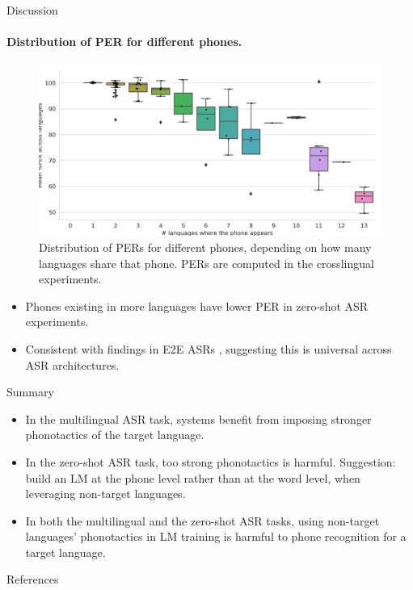 \documentclass{beamer}
\begin{document}
    
 \begin{frame}{Discussion}
 \framesubtitle{Distribution of PER for different phones.}
 \begin{figure}
     \centering
     \includegraphics[width=0.6\linewidth]{Figure/per_language_per_crosslingual.png}
     \caption{Distribution of PERs for different phones, depending on how many languages share that phone. PERs are computed in the crosslingual experiments.}
     \label{fig:distr_phone}
 \end{figure}
 \begin{block}{}
     \begin{footnotesize}
            \begin{itemize}
                \item Phones existing in more languages have lower PER in zero-shot ASR experiments.
                \item Consistent with findings in E2E ASRs \cite{Zelasko2020That_interspeech}, suggesting this is universal across ASR architectures.
            \end{itemize}
     \end{footnotesize}
 \end{block}
     
 \end{frame}
 \begin{frame}{Summary}
\begin{itemize}
    \item In the multilingual ASR task, systems benefit from imposing stronger phonotactics of the target language.
    \item In the zero-shot ASR task, too strong phonotactics is harmful. Suggestion:  build an LM  at the phone level rather than at the word level, when leveraging non-target languages.
    \item In both the multilingual and the zero-shot ASR tasks, using non-target languages' phonotactics in LM  training is  harmful to phone recognition for a target language.
\end{itemize}
    
\end{frame}
\begin{frame}{References}
%

\begin{tiny}

\end{tiny}
\end{frame}
\end{document}
